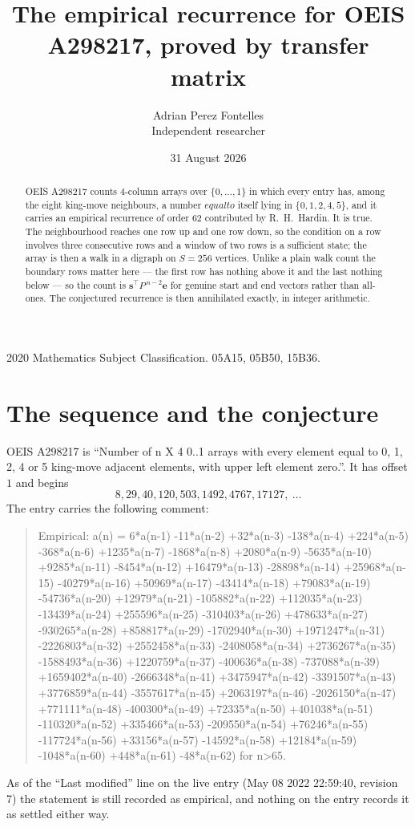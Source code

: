\documentclass[11pt,a4paper]{article}
\title{The empirical recurrence for OEIS A298217, proved by transfer matrix}
\author{Adrian Perez Fontelles\\ \small Independent researcher}
\date{31 August 2026}
\theoremstyle{plain}
\theoremstyle{definition}
\begin{document}
\maketitle

\begin{abstract}
OEIS A298217 counts $4$-column arrays over $\{0,\dots,1\}$ in which every entry has,
among the eight king-move neighbours, a number $equal to$ itself lying in $\{0,1,2,4,5\}$, and it carries an empirical
recurrence of order $62$ contributed by R.~H.~Hardin. It is true. The neighbourhood
reaches one row up and one row down, so the condition on a row involves three consecutive
rows and a window of two rows is a sufficient state; the array is then a walk in a digraph
on $S=256$ vertices. Unlike a plain walk count the boundary rows matter here --- the first
row has nothing above it and the last nothing below --- so the count is
$\mathbf{s}^{\!\top}P^{\,n-2}\mathbf{e}$ for genuine start and end vectors rather than
all-ones. The conjectured recurrence is then annihilated exactly, in integer arithmetic.
\end{abstract}

\noindent\small 2020 Mathematics Subject Classification. 05A15, 05B50, 15B36.\normalsize

\section{The sequence and the conjecture}

OEIS A298217 is ``Number of n X 4 0..1 arrays with every element equal to 0, 1, 2, 4 or 5 king-move adjacent elements, with upper left element zero.''. It has offset
$1$ and begins
\[
8, 29, 40, 120, 503, 1492, 4767, 17127,\ \dots
\]
The entry carries the following comment:
\begin{quote}\small
Empirical: a(n) = 6*a(n-1) -11*a(n-2) +32*a(n-3) -138*a(n-4) +224*a(n-5) -368*a(n-6) +1235*a(n-7) -1868*a(n-8) +2080*a(n-9) -5635*a(n-10) +9285*a(n-11) -8454*a(n-12) +16479*a(n-13) -28898*a(n-14) +25968*a(n-15) -40279*a(n-16) +50969*a(n-17) -43414*a(n-18) +79083*a(n-19) -54736*a(n-20) +12979*a(n-21) -105882*a(n-22) +112035*a(n-23) -13439*a(n-24) +255596*a(n-25) -310403*a(n-26) +478633*a(n-27) -930265*a(n-28) +858817*a(n-29) -1702940*a(n-30) +1971247*a(n-31) -2226803*a(n-32) +2552458*a(n-33) -2408058*a(n-34) +2736267*a(n-35) -1588493*a(n-36) +1220759*a(n-37) -400636*a(n-38) -737088*a(n-39) +1659402*a(n-40) -2666348*a(n-41) +3475947*a(n-42) -3391507*a(n-43) +3776859*a(n-44) -3557617*a(n-45) +2063197*a(n-46) -2026150*a(n-47) +771111*a(n-48) -400300*a(n-49) +72335*a(n-50) +401038*a(n-51) -110320*a(n-52) +335466*a(n-53) -209550*a(n-54) +76246*a(n-55) -117724*a(n-56) +33156*a(n-57) -14592*a(n-58) +12184*a(n-59) -1048*a(n-60) +448*a(n-61) -48*a(n-62) for n>65.
\end{quote}
As of the ``Last modified'' line on the live entry (May 08 2022 22:59:40, revision
7) the statement is still recorded as empirical, and nothing on the entry
records it as settled either way.
\end{document}

